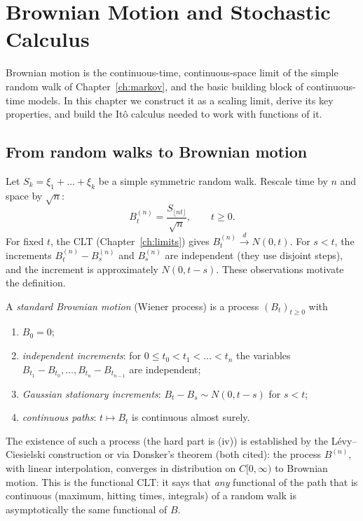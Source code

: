 \chapter{Brownian Motion and Stochastic Calculus}
\label{ch:bm}

Brownian motion is the continuous-time, continuous-space limit of the simple random walk
of Chapter~\ref{ch:markov}, and the basic building block of continuous-time models. In
this chapter we construct it as a scaling limit, derive its key properties, and build
the It\^o calculus needed to work with functions of it.

\section{From random walks to Brownian motion}

Let $S_k=\xi_1+\dots+\xi_k$ be a simple symmetric random walk. Rescale time by $n$ and
space by $\sqrt n$:
\[
B^{(n)}_t=\frac{S_{\lfloor nt\rfloor}}{\sqrt n},\qquad t\ge0 .
\]
For fixed $t$, the CLT (Chapter~\ref{ch:limits}) gives $B^{(n)}_t\xrightarrow{d}N(0,t)$.
For $s<t$, the increments $B^{(n)}_t-B^{(n)}_s$ and $B^{(n)}_s$ are independent (they use
disjoint steps), and the increment is approximately $N(0,t-s)$. These observations
motivate the definition.

\begin{definition}
A \emph{standard Brownian motion} (Wiener process) is a process $(B_t)_{t\ge0}$ with
\begin{enumerate}[label=(\roman*)]
\item $B_0=0$;
\item \emph{independent increments}: for $0\le t_0<t_1<\dots<t_n$ the variables
$B_{t_1}-B_{t_0},\dots,B_{t_n}-B_{t_{n-1}}$ are independent;
\item \emph{Gaussian stationary increments}: $B_t-B_s\sim N(0,t-s)$ for $s<t$;
\item \emph{continuous paths}: $t\mapsto B_t$ is continuous almost surely.
\end{enumerate}
\end{definition}

The existence of such a process (the hard part is (iv)) is established by the
L\'evy--Ciesielski construction or via Donsker's theorem (both cited): the process
$B^{(n)}$, with linear interpolation, converges in distribution on $C[0,\infty)$ to
Brownian motion. This is the functional CLT: it says that \emph{any} functional of the
path that is continuous (maximum, hitting times, integrals) of a random walk is
asymptotically the same functional of $B$.


